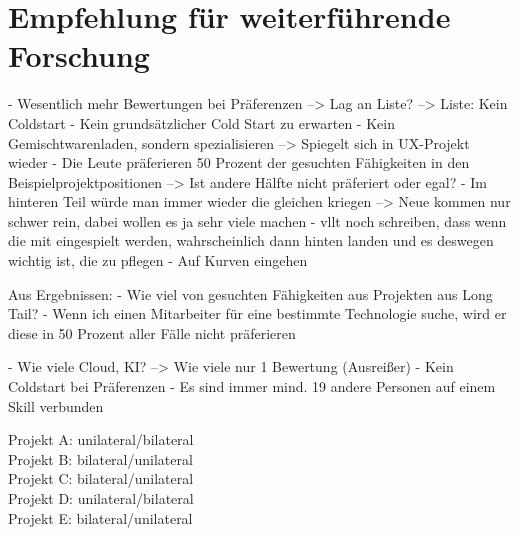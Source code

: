 \section{Empfehlung für weiterführende Forschung}
\label{ch:diskussion:empfehlungen}
- Wesentlich mehr Bewertungen bei Präferenzen --> Lag an Liste? --> Liste: Kein Coldstart
- Kein grundsätzlicher Cold Start zu erwarten
- Kein Gemischtwarenladen, sondern spezialisieren --> Spiegelt sich in UX-Projekt wieder
- Die Leute präferieren 50 Prozent der gesuchten Fähigkeiten in den Beispielprojektpositionen --> Ist andere Hälfte nicht präferiert oder egal?
- Im hinteren Teil würde man immer wieder die gleichen kriegen --> Neue kommen nur schwer rein, dabei wollen es ja sehr viele machen
- vllt noch schreiben, dass wenn die mit eingespielt werden, wahrscheinlich dann hinten landen und es deswegen wichtig ist, die zu pflegen
- Auf Kurven eingehen

Aus Ergebnissen:
- Wie viel von gesuchten Fähigkeiten aus Projekten aus Long Tail?
- Wenn ich einen Mitarbeiter für eine bestimmte Technologie suche, wird er diese in 50 Prozent aller Fälle nicht präferieren

- Wie viele Cloud, KI? --> Wie viele nur 1 Bewertung (Ausreißer)
- Kein Coldstart bei Präferenzen
- Es sind immer mind. 19 andere Personen auf einem Skill verbunden

Projekt A: unilateral/bilateral\\
Projekt B: bilateral/unilateral\\
Projekt C: bilateral/unilateral\\
Projekt D: unilateral/bilateral\\
Projekt E: bilateral/unilateral


